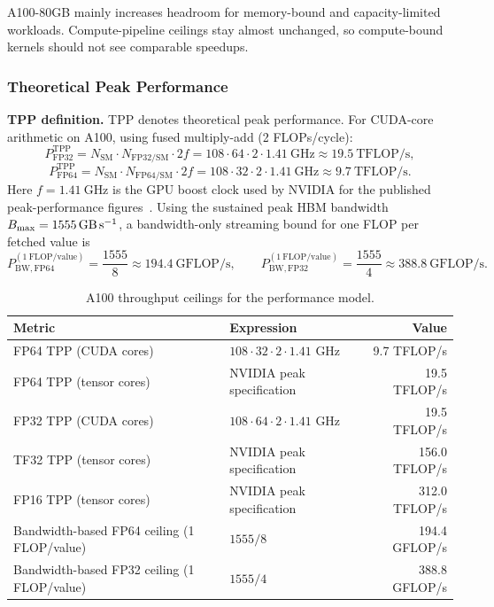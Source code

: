 A100-80GB mainly increases headroom for memory-bound and capacity-limited
workloads. Compute-pipeline ceilings stay almost unchanged, so compute-bound
kernels should not see comparable speedups.

\subsubsection{Theoretical Peak Performance}

\noindent\textbf{TPP definition.}
TPP denotes theoretical peak performance.
For CUDA-core arithmetic on A100, using fused multiply-add (2 FLOPs/cycle):
\[
  P_{\mathrm{FP32}}^{\mathrm{TPP}}
  = N_{\mathrm{SM}} \cdot N_{\mathrm{FP32/SM}} \cdot 2f
  = 108 \cdot 64 \cdot 2 \cdot 1.41\ \text{GHz}
  \approx 19.5\ \text{TFLOP/s},
\]
\[
  P_{\mathrm{FP64}}^{\mathrm{TPP}}
  = N_{\mathrm{SM}} \cdot N_{\mathrm{FP64/SM}} \cdot 2f
  = 108 \cdot 32 \cdot 2 \cdot 1.41\ \text{GHz}
  \approx 9.7\ \text{TFLOP/s}.
\]
Here $f=\SI{1.41}{\giga\hertz}$ is the GPU boost clock used by NVIDIA for the
published peak-performance figures~\cite{nvidia2020a100}.
Using the sustained peak HBM bandwidth
$B_{\max}=\SI{1555}{\giga\byte\per\second}$, a bandwidth-only streaming bound
for one FLOP per fetched value is
\[
  P_{\mathrm{BW,FP64}}^{(1\ \mathrm{FLOP/value})}
  = \frac{1555}{8}
  \approx 194.4\ \text{GFLOP/s},
  \qquad
  P_{\mathrm{BW,FP32}}^{(1\ \mathrm{FLOP/value})}
  = \frac{1555}{4}
  \approx 388.8\ \text{GFLOP/s}.
\]

\begin{table}[H]
\centering
\caption{A100 throughput ceilings for the performance model.}
\label{tab:a100-peak-performance}
\begin{tabularx}{\textwidth}{X X r}
\toprule
Metric & Expression & Value \\
\midrule
FP64 TPP (CUDA cores) & $108\cdot 32\cdot 2\cdot 1.41$ GHz & \num{9.7} TFLOP/s \\
FP64 TPP (tensor cores) & NVIDIA peak specification & \num{19.5} TFLOP/s \\
FP32 TPP (CUDA cores) & $108\cdot 64\cdot 2\cdot 1.41$ GHz & \num{19.5} TFLOP/s \\
TF32 TPP (tensor cores) & NVIDIA peak specification & \num{156.0} TFLOP/s \\
FP16 TPP (tensor cores) & NVIDIA peak specification & \num{312.0} TFLOP/s \\
Bandwidth-based FP64 ceiling (1 FLOP/value) & $1555/8$ & \num{194.4} GFLOP/s \\
Bandwidth-based FP32 ceiling (1 FLOP/value) & $1555/4$ & \num{388.8} GFLOP/s \\
\bottomrule
\end{tabularx}
\end{table}


